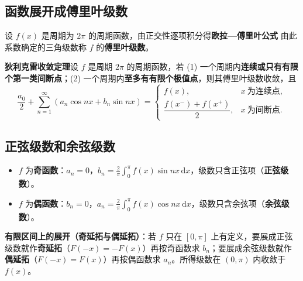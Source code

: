 \subsection{函数展开成傅里叶级数}

设 $f(x)$ 是周期为 $2\pi$ 的周期函数，由正交性逐项积分得\textbf{欧拉—傅里叶公式}
由此系数确定的三角级数称 $f$ 的\textbf{傅里叶级数}。

\textbf{狄利克雷收敛定理}\quad 设 $f$ 是周期 $2\pi$ 的周期函数，若 (1) 一个周期内\textbf{连续或只有有限个第一类间断点}；(2) 一个周期内\textbf{至多有有限个极值点}，则其傅里叶级数收敛，且
\[
\frac{a_0}{2}+\sum_{n=1}^{\infty}(a_n\cos nx+b_n\sin nx)=
\begin{cases}
f(x), & x\ \text{为连续点},\\[3pt]
\dfrac{f(x^-)+f(x^+)}{2}, & x\ \text{为间断点}.
\end{cases}
\]


\subsection{正弦级数和余弦级数}

\begin{itemize}
  \item $f$ 为\textbf{奇函数}：$a_n=0$，$b_n=\frac{2}{\pi}\int_0^{\pi}f(x)\sin nx\,\mathrm{d}x$，级数只含正弦项（\textbf{正弦级数}）。
  \item $f$ 为\textbf{偶函数}：$b_n=0$，$a_n=\frac{2}{\pi}\int_0^{\pi}f(x)\cos nx\,\mathrm{d}x$，级数只含余弦项（\textbf{余弦级数}）。
\end{itemize}

\textbf{有限区间上的展开（奇延拓与偶延拓）}：若 $f$ 只在 $[0,\pi]$ 上有定义，要展成正弦级数就作\textbf{奇延拓}（$F(-x)=-F(x)$）再按奇函数求 $b_n$；要展成余弦级数就作\textbf{偶延拓}（$F(-x)=F(x)$）再按偶函数求 $a_n$。所得级数在 $(0,\pi)$ 内收敛于 $f(x)$。



